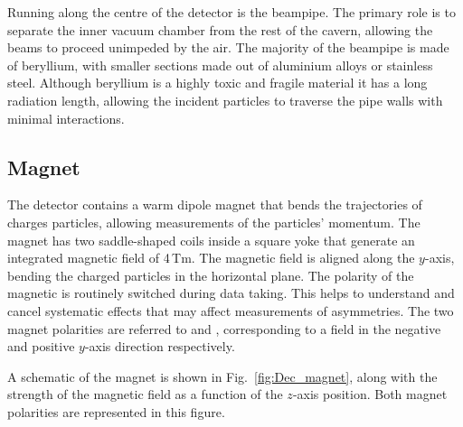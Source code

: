 Running along the centre of the detector is the \lhcb beampipe. The primary role is to separate the inner vacuum chamber from the rest of the cavern, allowing the beams to proceed unimpeded by the air. The majority of the beampipe is made of beryllium, with smaller sections made out of aluminium alloys or stainless steel. Although beryllium is a highly toxic and fragile material it has a long radiation length, allowing the incident particles to traverse the pipe walls with minimal interactions.  


\subsection{Magnet}

The \lhcb detector contains a warm dipole magnet that bends the trajectories of charges particles, allowing measurements of the particles' momentum. The magnet has two saddle-shaped coils inside a square yoke that generate an integrated magnetic field of 4\,Tm.  
The magnetic field is aligned along the $y$-axis, bending the charged particles in the horizontal plane. The polarity of the magnetic is routinely switched during data taking. This helps to understand and cancel systematic effects that may affect measurements of \CP asymmetries. The two magnet polarities are referred to \MagDown and \MagUp, corresponding to a field in the negative and positive $y$-axis direction respectively.   

A schematic of the magnet is shown in Fig.~\ref{fig:Dec_magnet}, along with the strength of the magnetic field as a function of the $z$-axis position. Both magnet polarities are represented in this figure. 


